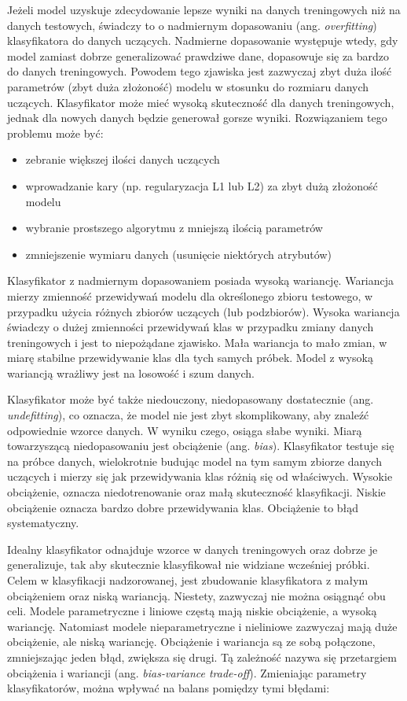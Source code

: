 Jeżeli model uzyskuje zdecydowanie lepsze wyniki na danych treningowych niż na danych testowych, świadczy to o nadmiernym dopasowaniu (ang. \textit{overfitting}) klasyfikatora do danych uczących. Nadmierne dopasowanie występuje wtedy, gdy model zamiast dobrze generalizować prawdziwe dane, dopasowuje się za bardzo do danych treningowych. Powodem tego zjawiska jest zazwyczaj zbyt duża ilość parametrów (zbyt duża złożoność) modelu w stosunku do rozmiaru danych uczących. Klasyfikator może mieć wysoką skuteczność dla danych treningowych, jednak dla nowych danych będzie generował gorsze wyniki. Rozwiązaniem tego problemu może być:
\begin{itemize}
	\item zebranie większej ilości danych uczących
	\item wprowadzanie kary (np. regularyzacja L1 lub L2) za zbyt dużą złożoność modelu
	\item wybranie prostszego algorytmu z mniejszą ilością parametrów
	\item zmniejszenie wymiaru danych (usunięcie niektórych atrybutów)
\end{itemize}
Klasyfikator z nadmiernym dopasowaniem posiada wysoką wariancję. Wariancja mierzy zmienność przewidywań modelu dla określonego zbioru testowego, w przypadku użycia różnych zbiorów uczących (lub podzbiorów). Wysoka wariancja świadczy o dużej zmienności przewidywań klas w przypadku zmiany danych treningowych i jest to niepożądane zjawisko. Mała wariancja to mało zmian, w miarę stabilne przewidywanie klas dla tych samych próbek. Model z wysoką wariancją wrażliwy jest na losowość i szum danych. \par
Klasyfikator może być także niedouczony, niedopasowany dostatecznie (ang. \textit{undefitting}), co oznacza, że model nie jest zbyt skomplikowany, aby znaleźć odpowiednie wzorce danych. W wyniku czego, osiąga słabe wyniki. Miarą towarzyszącą niedopasowaniu jest obciążenie (ang. \textit{bias}). Klasyfikator testuje się na próbce danych, wielokrotnie budując model na tym samym zbiorze danych uczących i mierzy się jak przewidywania klas różnią się od właściwych. Wysokie obciążenie, oznacza niedotrenowanie oraz małą skuteczność klasyfikacji. Niskie obciążenie oznacza bardzo dobre przewidywania klas. Obciążenie to błąd systematyczny. \par
{}
Idealny klasyfikator odnajduje wzorce w danych treningowych oraz dobrze je generalizuje, tak aby skutecznie klasyfikował nie widziane wcześniej próbki. Celem w klasyfikacji nadzorowanej, jest zbudowanie klasyfikatora z małym obciążeniem oraz niską wariancją. Niestety, zazwyczaj nie można osiągnąć obu celi. Modele parametryczne i liniowe częstą mają niskie obciążenie, a wysoką wariancję. Natomiast modele nieparametryczne i nieliniowe zazwyczaj mają duże obciążenie, ale niską wariancję. Obciążenie i wariancja są ze sobą połączone, zmniejszając jeden błąd, zwiększa się drugi. Tą zależność nazywa się przetargiem obciążenia i wariancji (ang. \textit{bias-variance trade-off}). Zmieniając parametry klasyfikatorów, można wpływać na balans pomiędzy tymi błędami:
